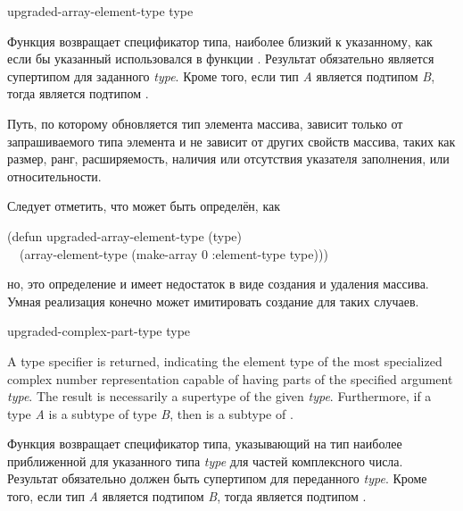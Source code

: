 \begin{defun}[Function]
upgraded-array-element-type type

Функция возвращает спецификатор типа, наиболее близкий к указанному, как если бы
указанный использовался в функции .
Результат обязательно является супертипом для заданного \emph{type}.
Кроме того, если тип \emph{A} является подтипом \emph{B}, тогда 
 является подтипом
.

Путь, по которому обновляется тип элемента массива, зависит только от запрашиваемого
типа элемента и не зависит от других свойств массива, таких как размер, ранг, 
расширяемость, наличия или отсутствия указателя заполнения, или относительности.

Следует отметить, что  может быть определён,
как
\begin{lisp}
(defun upgraded-array-element-type (type) \\
~~(array-element-type (make-array 0 :element-type type)))
\end{lisp}
но, это определение и имеет недостаток в виде создания и удаления массива. Умная
реализация конечно может имитировать создание для таких случаев.
\end{defun}


\begin{defun}[Function]
upgraded-complex-part-type type

A type specifier is returned, indicating the element type
of the most specialized complex number representation capable of having
parts of the specified argument \emph{type}.
The result is necessarily a supertype of the given \emph{type}.
Furthermore, if a type \emph{A} is a subtype of type \emph{B}, then
 is a subtype of
.

Функция возвращает спецификатор типа, указывающий на тип наиболее
приближенной для указанного типа \emph{type} для частей комплексного числа.
Результат обязательно должен быть супертипом для переданного \emph{type}.
Кроме того, если тип \emph{A} является подтипом \emph{B}, тогда
 является подтипом 
.
\end{defun}

\fi